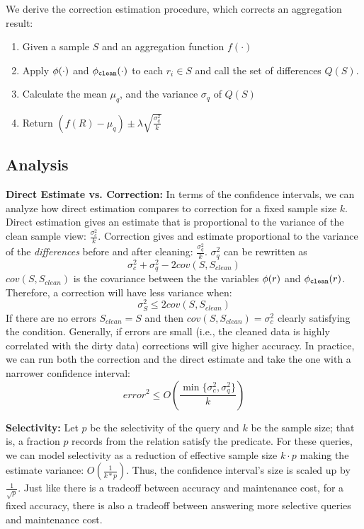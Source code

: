 We derive the correction estimation procedure, which corrects an aggregation result:
\begin{enumerate}
\item Given a sample $S$ and an aggregation function $f(\cdot)$
\item Apply $\phi (\cdot)$ and $\phi_{\texttt{clean} } (\cdot)$ to each $r_i \in S$ and call the set of differences  $Q(S)$.
\item Calculate the mean $\mu_q$, and the variance $\sigma_q$ of $Q(S)$
\item Return $(f(R) - \mu_q) \pm \lambda \sqrt{\frac{\sigma_q^2}{k}}$
\end{enumerate}

\subsection{Analysis}
\noindent \textbf{Direct Estimate vs. Correction: } In terms of the confidence intervals, we can analyze how direct estimation compares to correction for a fixed sample size $k$.
\sloppy
Direct estimation gives an estimate that is proportional to the variance of the clean sample view:  $\frac{\sigma_{c}^2}{k}$.
Correction gives and estimate proportional to the variance of the \emph{differences} before and after cleaning: $\frac{\sigma_{q}^2}{k}$.
$\sigma_{q}^2$ can be rewritten as
\[\sigma_{c}^2 + \sigma_{q}^2 - 2cov(S,S_{clean})\]
$cov(S,S_{clean})$ is the covariance between the the variables $\phi (r)$ and $\phi_{\texttt{clean} } (r)$.
Therefore, a correction will have less variance when:
\begin{equation}\sigma_{S}^2 \le 2cov(S,S_{clean})\end{equation}
If there are no errors $S_{clean} = S$ and then $cov(S,S_{clean})=\sigma_c^2$ clearly satisfying the condition.
Generally, if errors are small (i.e., the cleaned data is highly correlated with the dirty data) corrections will give higher accuracy.
In practice, we can run both the correction and the direct estimate and take the one with a narrower confidence interval:
\begin{equation}
error^2 \le O(\frac{\min\{\sigma_c^2,\sigma_q^2\}}{k})
\end{equation}

\vspace{0.5em}

\noindent \textbf{Selectivity: }
Let $p$ be the selectivity of the query and $k$ be the sample size; that is, a fraction $p$ records from the relation satisfy the predicate.
For these queries, we can model selectivity as a reduction of effective sample size $k\cdot p$ making the
estimate variance: $O(\frac{1}{k*p})$.
Thus, the confidence interval's size is scaled up by $\frac{1}{\sqrt{p}}$.
Just like there is a tradeoff between accuracy and maintenance cost, for a fixed accuracy, 
there is also a tradeoff between answering more selective queries and maintenance cost.

